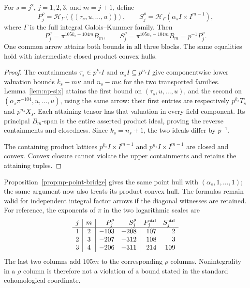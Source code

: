 \begin{theorem}
\label{thm:np-two-hulls}
For $s=j^2$, $j=1,2,3$, and $m=j+1$, define
\[
 P_j^\rho=\mathcal H_\Gamma(\{(\tau_s,u,\ldots,u)\}),\qquad
 S_j^\rho=\mathcal H_\Gamma(\alpha_sI\times I^{m-1}),
\]
where $\Gamma$ is the full integral Galois--Kummer family.
Then
\begin{equation}\label{eq:np-two-hulls}
 P_j^\rho=\pi^{105k_s-104m}B_m,\qquad
 S_j^\rho=\pi^{105n_s-104m}B_m=p^{-1}P_j^\rho .
\end{equation}
One common arrow attains both bounds in all three blocks.
The same equalities hold with intermediate closed product
convex hulls.
\end{theorem}
\begin{proof}
The containments $\tau_s\in p^{k_s}I$ and
$\alpha_sI\subseteq p^{n_s}I$ give componentwise lower
valuation bounds $k_s-m\kappa$ and $n_s-m\kappa$ for
the two transported families. Lemma~\ref{lem:np-six}
attains the first bound on
$(\tau_s,u,\ldots,u)$, and the second on
$(\alpha_s\pi^{-104},u,\ldots,u)$, using the same arrow:
their first entries are respectively $p^{k_s}T_s$ and
$p^{n_s}X_s$. Each attaining tensor has that valuation
in every field component. Its principal $B_m$-span is
the entire asserted product ideal, proving the reverse
containments and closedness. Since $k_s=n_s+1$,
the two ideals differ by $p^{-1}$.

The containing product lattices
$p^{k_s}I\times I^{m-1}$ and $p^{n_s}I\times I^{m-1}$
are closed and convex. Convex closure cannot violate
the upper containments and retains the attaining tuples.
\end{proof}

Proposition~\ref{prop:np-point-bridge} gives the same point
hull with $(\alpha_s,1,\ldots,1)$; the same argument now
also treats its product convex hull. The formulas remain
valid for independent integral factor arrows if the
diagonal witnesses are retained. For reference, the
exponents of $\pi$ in the two logarithmic scales are
\[
 \begin{array}{c|c|rr|rr}
 j&m&P_j^\rho&S_j^\rho&P_j^{\rm std}&S_j^{\rm std}\\ \hline
 1&2&-103&-208&107&2\\
 2&3&-207&-312&108&3\\
 3&4&-206&-311&214&109
 \end{array}
\]
The last two columns add $105m$ to the corresponding
$\rho$ columns. Nonintegrality in a $\rho$ column is
therefore not a violation of a bound stated in the
standard cohomological coordinate.

